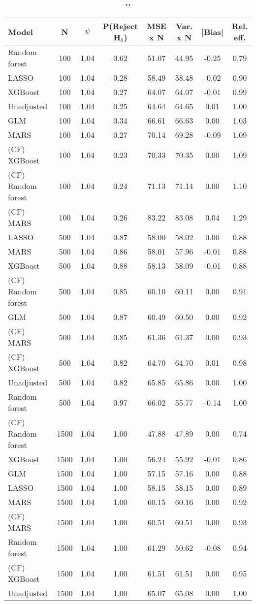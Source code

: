 \begin{table}
\centering
\caption{""}
\begin{tabular}{lccccccc}
\toprule
Model & N & $\psi$ & P(Reject H$_0$) & MSE x N & Var. x N & |Bias| & Rel. eff.\\ \midrule
Random forest & 100 & 1.04 & 0.62 & 51.07 & 44.95 & -0.25 & 0.79 \\ 
LASSO & 100 & 1.04 & 0.28 & 58.49 & 58.48 & -0.02 & 0.90 \\ 
XGBoost & 100 & 1.04 & 0.27 & 64.07 & 64.07 & -0.01 & 0.99 \\ 
Unadjusted & 100 & 1.04 & 0.25 & 64.64 & 64.65 &  0.01 & 1.00 \\ 
GLM & 100 & 1.04 & 0.34 & 66.61 & 66.63 &  0.00 & 1.03 \\ 
MARS & 100 & 1.04 & 0.27 & 70.14 & 69.28 & -0.09 & 1.09 \\ 
(CF) XGBoost & 100 & 1.04 & 0.23 & 70.33 & 70.35 &  0.00 & 1.09 \\ 
(CF) Random forest & 100 & 1.04 & 0.24 & 71.13 & 71.14 &  0.00 & 1.10 \\ 
(CF) MARS & 100 & 1.04 & 0.26 & 83.22 & 83.08 &  0.04 & 1.29 \\ \addlinespace 
LASSO & 500 & 1.04 & 0.87 & 58.00 & 58.02 &  0.00 & 0.88 \\ 
MARS & 500 & 1.04 & 0.86 & 58.01 & 57.96 & -0.01 & 0.88 \\ 
XGBoost & 500 & 1.04 & 0.88 & 58.13 & 58.09 & -0.01 & 0.88 \\ 
(CF) Random forest & 500 & 1.04 & 0.85 & 60.10 & 60.11 &  0.00 & 0.91 \\ 
GLM & 500 & 1.04 & 0.87 & 60.49 & 60.50 &  0.00 & 0.92 \\ 
(CF) MARS & 500 & 1.04 & 0.85 & 61.36 & 61.37 &  0.00 & 0.93 \\ 
(CF) XGBoost & 500 & 1.04 & 0.82 & 64.70 & 64.70 &  0.01 & 0.98 \\ 
Unadjusted & 500 & 1.04 & 0.82 & 65.85 & 65.86 &  0.00 & 1.00 \\ 
Random forest & 500 & 1.04 & 0.97 & 66.02 & 55.77 & -0.14 & 1.00 \\ \addlinespace 
(CF) Random forest & 1500 & 1.04 & 1.00 & 47.88 & 47.89 &  0.00 & 0.74 \\ 
XGBoost & 1500 & 1.04 & 1.00 & 56.24 & 55.92 & -0.01 & 0.86 \\ 
GLM & 1500 & 1.04 & 1.00 & 57.15 & 57.16 &  0.00 & 0.88 \\ 
LASSO & 1500 & 1.04 & 1.00 & 58.15 & 58.15 &  0.00 & 0.89 \\ 
MARS & 1500 & 1.04 & 1.00 & 60.15 & 60.16 &  0.00 & 0.92 \\ 
(CF) MARS & 1500 & 1.04 & 1.00 & 60.51 & 60.51 &  0.00 & 0.93 \\ 
Random forest & 1500 & 1.04 & 1.00 & 61.29 & 50.62 & -0.08 & 0.94 \\ 
(CF) XGBoost & 1500 & 1.04 & 1.00 & 61.51 & 61.51 &  0.00 & 0.95 \\ 
Unadjusted & 1500 & 1.04 & 1.00 & 65.07 & 65.08 &  0.00 & 1.00 \\
\bottomrule
\end{tabular}
\end{table}

